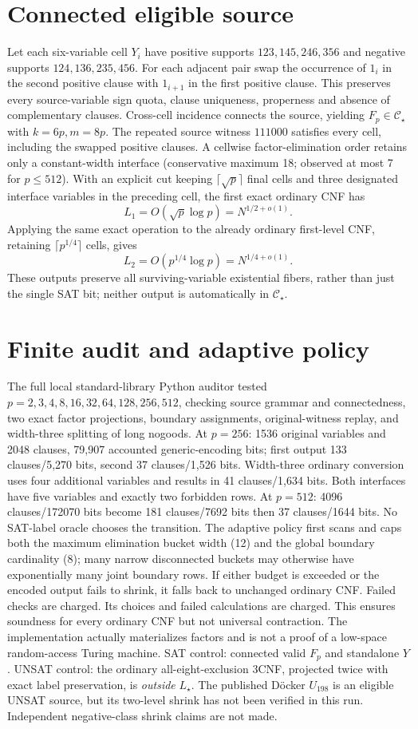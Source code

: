 \documentclass[11pt]{article}
\begin{document}
\section{Connected eligible source}
Let each six-variable cell \(Y_i\) have positive supports \(123,145,246,356\) and negative supports \(124,136,235,456\). For each adjacent pair swap the occurrence of \(1_i\) in the second positive clause with \(1_{i+1}\) in the first positive clause. This preserves every source-variable sign quota, clause uniqueness, properness and absence of complementary clauses. Cross-cell incidence connects the source, yielding \(F_p\in\mathcal C_\star\) with \(k=6p,m=8p\). The repeated source witness \(111000\) satisfies every cell, including the swapped positive clauses.
A cellwise factor-elimination order retains only a constant-width interface (conservative maximum 18; observed at most 7 for \(p\le512\)). With an explicit cut keeping \(\lceil\sqrt p\rceil\) final cells and three designated interface variables in the preceding cell, the first exact ordinary CNF has
\[
L_1=O(\sqrt p\log p)=N^{1/2+o(1)}.
\]
Applying the same exact operation to the already ordinary first-level CNF, retaining \(\lceil p^{1/4}\rceil\) cells, gives
\[
L_2=O(p^{1/4}\log p)=N^{1/4+o(1)}.
\]
These outputs preserve all surviving-variable existential fibers, rather than just the single SAT bit; neither output is automatically in \(\mathcal C_\star\).
\section{Finite audit and adaptive policy}
The full local standard-library Python auditor tested \(p=2,3,4,8,16,32,64,128,256,512\), checking source grammar and connectedness, two exact factor projections, boundary assignments, original-witness replay, and width-three splitting of long nogoods.
At \(p=256\): 1536 original variables and 2048 clauses, 79,907 accounted generic-encoding bits; first output 133 clauses/5,270 bits, second 37 clauses/1,526 bits. Width-three ordinary conversion uses four additional variables and results in 41 clauses/1,634 bits. Both interfaces have five variables and exactly two forbidden rows. At \(p=512\): 4096 clauses/172070 bits become 181 clauses/7692 bits then 37 clauses/1644 bits. No SAT-label oracle chooses the transition.
The adaptive policy first scans and caps both the maximum elimination bucket width (12) and the global boundary cardinality (8); many narrow disconnected buckets may otherwise have exponentially many joint boundary rows. If either budget is exceeded or the encoded output fails to shrink, it falls back to unchanged ordinary CNF. Failed checks are charged. Its choices and failed calculations are charged. This ensures soundness for every ordinary CNF but not universal contraction. The implementation actually materializes factors and is not a proof of a low-space random-access Turing machine.
SAT control: connected valid \(F_p\) and standalone \(Y\). UNSAT control: the ordinary all-eight-exclusion 3CNF, projected twice with exact label preservation, is \emph{outside} \(L_\star\). The published D\"ocker \(U_{198}\) is an eligible UNSAT source, but its two-level shrink has not been verified in this run. Independent negative-class shrink claims are not made.
\end{document}
